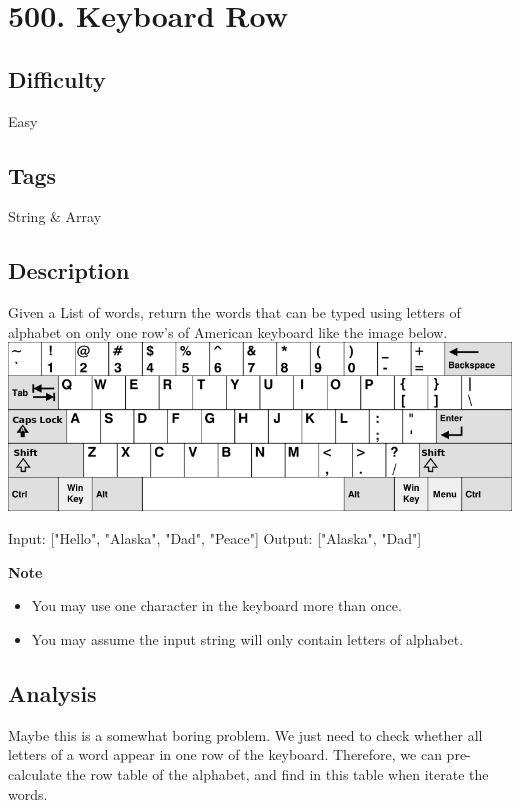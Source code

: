 \tocless\section{500. Keyboard Row}
\label{algo:500}

\subsection*{Difficulty}
Easy

\subsection*{Tags}
String \& Array

\subsection*{Description}
Given a List of words, return the words that can be typed using letters of alphabet on only one row's of American keyboard like the image below.
\includegraphics[width=15.8cm]{figs/algo_500_1}

\begin{example}
\begin{multilinecode}
Input: ["Hello", "Alaska", "Dad", "Peace"]
Output: ["Alaska", "Dad"]
\end{multilinecode}
\end{example}

\textbf{Note}
\begin{itemize}
    \item You may use one character in the keyboard more than once.
    \item You may assume the input string will only contain letters of alphabet.
\end{itemize}

\subsection*{Analysis}
Maybe this is a somewhat boring problem. We just need to check whether all letters of a word appear in one row of the keyboard. Therefore, we can pre-calculate the row table of the alphabet, and find in this table when iterate the words.

